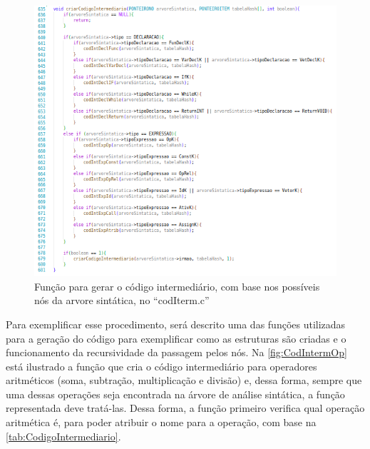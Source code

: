 \documentclass[
	12pt,				%
	oneside,
	a4paper,			%
	english,			%
	french,				%
	spanish,			%
	brazil,				%
	]{abntex2}
\begin{document}
\begin{figure}[H]
\centering 
\caption{Função para gerar o código intermediário, com base nos possíveis nós da arvore sintática, no \nohyphens{``codIterm.c''}} 
\label{fig:GerarCodInterm}
\graphicspath{ {./imgs/} } 
\includegraphics[scale=0.5]{imgs/Codigo/CodCriarCodInterm.png}
\end{figure}


Para exemplificar esse procedimento, será descrito uma das funções utilizadas para a geração do código para exemplificar como as estruturas são criadas e o funcionamento da recursividade da passagem pelos nós. Na \autoref{fig:CodIntermOp} está ilustrado a função que cria o código intermediário para operadores aritméticos (soma, subtração, multiplicação e divisão) e, dessa forma, sempre que uma dessas operações seja encontrada na árvore de análise sintática, a função representada deve tratá-las. Dessa forma, a função primeiro verifica qual operação aritmética é, para poder atribuir o nome para a operação, com base na \autoref{tab:CodigoIntermediario}. 
\end{document}
